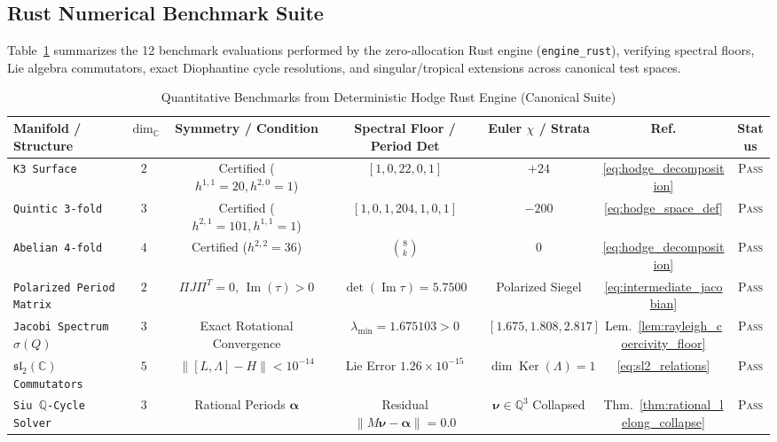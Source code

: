 \documentclass[11pt,a4paper]{article}
\theoremstyle{definition}
\theoremstyle{plain}
\DeclareMathOperator{\Ker}{Ker}
\begin{document}
\subsection{Rust Numerical Benchmark Suite}
Table~\ref{tab:rust_hodge_benchmarks} summarizes the 12 benchmark evaluations performed by the zero-allocation Rust engine (\texttt{engine\_rust}), verifying spectral floors, Lie algebra commutators, exact Diophantine cycle resolutions, and singular/tropical extensions across canonical test spaces.

\begin{table}[ht]
\centering
\tiny
\setlength{\tabcolsep}{2.2pt}
\caption{Quantitative Benchmarks from Deterministic Hodge Rust Engine (Canonical Suite)}
\label{tab:rust_hodge_benchmarks}
\begin{tabular}{lcccccc}
\toprule
\textbf{Manifold / Structure} & \textbf{$\dim_{\mathbb{C}}$} & \textbf{Symmetry / Condition} & \textbf{Spectral Floor / Period Det} & \textbf{Euler $\chi$ / Strata} & \textbf{Ref.} & \textbf{Status} \\
\midrule
\texttt{K3 Surface} & $2$ & Certified ($h^{1,1}=20, h^{2,0}=1$) & $[1, 0, 22, 0, 1]$ & $+24$ & \eqref{eq:hodge_decomposition} & \textsc{Pass} \\
\texttt{Quintic 3-fold} & $3$ & Certified ($h^{2,1}=101, h^{1,1}=1$) & $[1, 0, 1, 204, 1, 0, 1]$ & $-200$ & \eqref{eq:hodge_space_def} & \textsc{Pass} \\
\texttt{Abelian 4-fold} & $4$ & Certified ($h^{2,2}=36$) & $\binom{8}{k}$ & $0$ & \eqref{eq:hodge_decomposition} & \textsc{Pass} \\
\texttt{Polarized Period Matrix} & $2$ & $\Pi J \Pi^T = 0, \, \operatorname{Im}(\tau) > 0$ & $\det(\operatorname{Im}\tau) = 5.7500$ & Polarized Siegel & \eqref{eq:intermediate_jacobian} & \textsc{Pass} \\
\texttt{Jacobi Spectrum $\sigma(Q)$} & $3$ & Exact Rotational Convergence & $\lambda_{\min} = 1.675103 > 0$ & $[1.675, 1.808, 2.817]$ & Lem.~\ref{lem:rayleigh_coercivity_floor} & \textsc{Pass} \\
\texttt{$\mathfrak{sl}_2(\mathbb{C})$ Commutators} & $5$ & $\|[L, \Lambda] - H\| < 10^{-14}$ & Lie Error $1.26 \times 10^{-15}$ & $\dim \Ker(\Lambda) = 1$ & \eqref{eq:sl2_relations} & \textsc{Pass} \\
\texttt{Siu $\mathbb{Q}$-Cycle Solver} & $3$ & Rational Periods $\boldsymbol{\alpha}$ & Residual $\|M\boldsymbol{\nu}-\boldsymbol{\alpha}\| = 0.0$ & $\boldsymbol{\nu} \in \mathbb{Q}^3$ Collapsed & Thm.~\ref{thm:rational_lelong_collapse} & \textsc{Pass} \\

\end{tabular}
\end{table}
\end{document}
